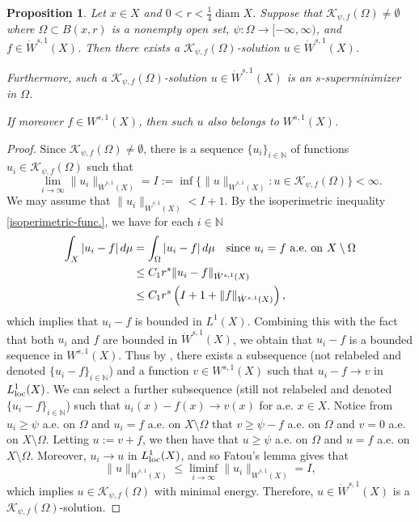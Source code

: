 \documentclass[11pt,leqno]{amsart}
\newtheorem{proposition}[theorem]{Proposition}
\numberwithin{equation}{section}
\theoremstyle{definition}
\newcommand{\loc}{_{\rm loc}}
\DeclareMathOperator{\diam}{diam}
\begin{document}
	\begin{proposition}\label{prop2.4-22nov}
		Let 
		$x\in X$ and $0<r<\frac{1}{4}\diam X$.
		Suppose that $\mathcal K_{\psi,f}(\Omega)\neq \emptyset$ where $\Omega\subset B(x,r)$ 
		is a nonempty open set, $\psi:\Omega\to [-\infty,\infty)$, and $f\in \dot W^{s,1}(X)$.
		Then  there exists a $\mathcal K_{\psi,f}(\Omega)$-solution $u\in \dot W^{s,1}(X)$.
		
		Furthermore, such a $\mathcal K_{\psi, f}(\Omega)$-solution $u\in \dot W^{s,1}(X)$  is an $s$-superminimizer 
		{ in $\Omega$. }
		
		If moreover $f\in W^{s,1}(X)$, then such $u$ also belongs to $W^{s,1}(X)$.
	\end{proposition}
	\begin{proof}
		Since $\mathcal K_{\psi,f}(\Omega)\neq \emptyset$, there is
		a sequence $\{ u_i\}_{i\in\mathbb N}$ of functions $u_i\in \mathcal{K}_{\psi,f}(\Omega)$ such that
		\[
		\lim_{i\to \infty} \|u_i\|_{\dot W^{s,1}(X)}
		=I
		:=\inf\{\|u\|_{\dot W^{s,1}(X)}: u\in \mathcal{K}_{\psi,f}(\Omega)\}< \infty.
		\]
		We may assume that $\|u_i\|_{\dot W^{s,1}(X)}<I+1$.
		By  the isoperimetric inequality \eqref{isoperimetric-func.},
		we have for each $i\in \mathbb{N}$
		\begin{align}
			\int_X|u_i-f|\,d\mu
			&=\int_{\Omega}|u_i-f|\,d\mu\quad \textrm{since\ }u_i=f\ {\rm a.e.\ on\ }X\setminus \Omega\notag \\
			&\le
			{C_1r^s}
			\|u_i-f\|_{\dot W^{s,1}(X)}\notag \\
			&\leq
			{C_1r^s}
			\left(I+1+\|f\|_{\dot W^{s,1}(X)} \right), \label{eq2.7-16dec}
		\end{align}
		which implies that $u_i-f$ is  bounded in $L^1(X)$.
		Combining this with the fact that both $u_i$ and $f$ are bounded in $\dot W^{s,1}(X)$, we obtain that
		$u_i-f$ is a bounded sequence in $W^{s,1}(X)$. Thus by \cite[Theorem 5.2]{Kl25}, there exists a subsequence (not relabeled and denoted $\{u_i-f\}_{i\in\mathbb N}$) and a function $v\in W^{s,1}(X)$ such that $u_i-f\to v$ in $L^1\loc(X)$. We can select a further subsequence (still not relabeled and denoted $\{u_i-f\}_{i\in\mathbb N}$) such that $u_i(x)-f(x)\to v(x)$ for a.e. $x\in X$. Notice from $u_i\geq \psi$ a.e. on $\Omega$ and $u_i=f$ a.e. on $X\setminus\Omega$ that $v\geq \psi-f$ a.e. on $\Omega$ and $v=0$ a.e. on $X\setminus\Omega$. Letting $u:=v+f$, we then have that  $u\geq \psi $ a.e. on $\Omega$ and $u=f$ a.e. on $X\setminus \Omega$. 
		Moreover, $u_i\to u$ in $L^1\loc (X)$, and so  Fatou's lemma gives  that
		\[
		\|u\|_{\dot W^{s,1}(X)}\leq \liminf_{i\to \infty}\|u_i\|_{\dot W^{s,1}(X)}=I,
		\]
		which implies $u\in \mathcal K_{\psi,f}(\Omega)$ with minimal energy. Therefore, $u\in\dot W^{s,1}(X)$ is a $\mathcal K_{\psi,f}(\Omega)$-solution.
		

\end{proof}
\end{document}
